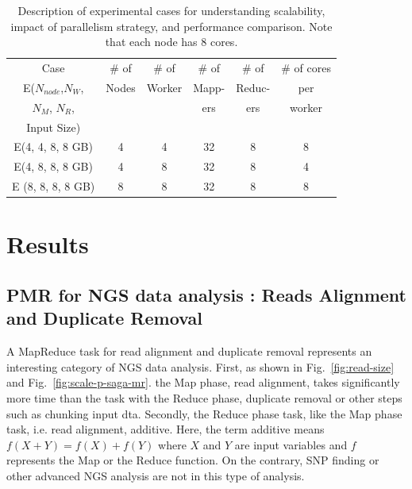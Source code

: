 \documentclass{sig-alternate}
\begin{document}
\begin{table}
\small
 \begin{tabular}{|c|c|c|c|c|c|} 
 \hline 

Case & \# of  & \# of &  \# of & \# of & \# of cores \\
E($N_{node}$,$N_W$,  & Nodes & Worker   & Mapp- & Reduc- & per   \\
$N_M$, $N_R$,  & &  & ers & ers & worker \\
Input Size) & & & & & \\
 \hline
E(4, 4, 8, 8 GB) &4 &  4 & 32  & 8 & 8 \\
E(4, 8, 8, 8 GB) & 4 & 8 & 32 & 8 & 4 \\
E (8, 8, 8, 8 GB) & 8 & 8 & 32 & 8 & 8 \\ 
 \hline
 \end{tabular}

 \caption{Description of experimental cases for understanding scalability, impact of parallelism strategy, and performance comparison. Note that each node has 8 cores.}
    \label{table:exp-description} 
\end{table}


\section{Results}\label{sec:results}

\subsection{PMR for NGS data analysis : Reads Alignment and Duplicate Removal}

A MapReduce task for read alignment and duplicate removal represents an interesting category of NGS data analysis.   First, as shown in  Fig.~\ref{fig:read-size} and Fig.~\ref{fig:scale-p-saga-mr}. the Map phase, read alignment, takes significantly more time than the task with the Reduce phase, duplicate removal or other steps such as chunking input dta.  Secondly, the Reduce phase task, like the Map phase task, i.e. read alignment, additive.  Here, the term additive means $f(X + Y) = f(X) + f(Y)$ where $X$ and $Y$ are input variables and $f$ represents the Map or the Reduce function.  On the contrary, SNP finding or other advanced NGS analysis are not in this type of analysis.   
\end{document}
